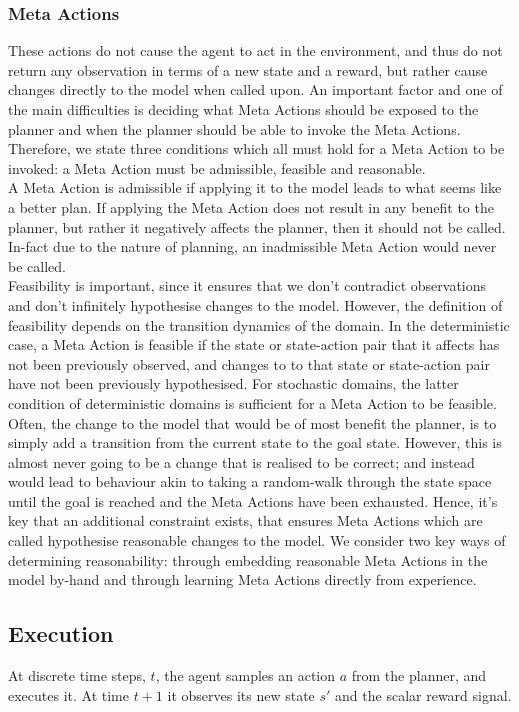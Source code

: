 \subsubsection{Meta Actions}
These actions do not cause the agent to act in the environment, and thus do not return any observation in terms of a new state and a reward, but rather cause changes directly to the model when called upon. An important factor and one of the main difficulties is deciding what Meta Actions should be exposed to the planner and when the planner should be able to invoke the Meta Actions. Therefore, we state three conditions which all must hold for a Meta Action to be invoked: a Meta Action must be admissible, feasible and reasonable.
\\A Meta Action is admissible if applying it to the model leads to what seems like a better plan. If applying the Meta Action does not result in any benefit to the planner, but rather it negatively affects the planner, then it should not be called. In-fact due to the nature of planning, an inadmissible Meta Action would never be called.\\Feasibility is important, since it ensures that we don't contradict observations and don't infinitely hypothesise changes to the model. However, the definition of feasibility depends on the transition dynamics of the domain. In the deterministic case, a Meta Action is feasible if the state or state-action pair that it affects has not been previously observed, and changes to to that state or state-action pair have not been previously hypothesised.
For stochastic domains, the latter condition of deterministic domains is sufficient for a Meta Action to be feasible.
\\Often, the change to the model that would be of most benefit the planner, is to simply add a transition from the current state to the goal state. However, this is almost never going to be a change that is realised to be correct; and instead would lead to behaviour akin to taking a random-walk through the state space until the goal is reached and the Meta Actions have been exhausted. Hence, it's key that an additional constraint exists, that ensures Meta Actions which are called hypothesise reasonable changes to the model. We consider two key ways of determining reasonability: through embedding reasonable Meta Actions in the model by-hand and through learning Meta Actions directly from experience.
\subsection{Execution}
At discrete time steps, $t$, the agent samples an action $a$ from the planner, and executes it. At time $t+1$ it observes its new state $s'$ and the scalar reward signal.
